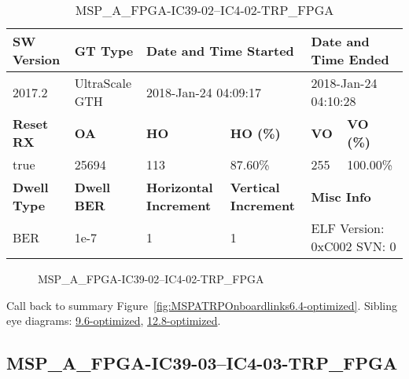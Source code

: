 \begin{table}[h]
\centering
\caption{MSP\_A\_FPGA-IC39-02--IC4-02-TRP\_FPGA}
\label{tab:MSPAFPGAIC3902IC402TRPFPGA6.4-optimized}
\begin{tabular}{@{}|l|l|l|l|l|l|@{}}
\toprule
\textbf{SW Version}                & \textbf{GT Type}   & \multicolumn{2}{l|}{\textbf{Date and Time Started}}            & \multicolumn{2}{l|}{\textbf{Date and Time Ended}}        \\ \midrule
2017.2                       & UltraScale GTH          & \multicolumn{2}{l|}{2018-Jan-24 04:09:17}                   & \multicolumn{2}{l|}{2018-Jan-24 04:10:28}               \\ \midrule
\textbf{Reset RX}                  & \textbf{OA} & \textbf{HO}   & \textbf{HO (\%)} & \textbf{VO} & \textbf{VO (\%)} \\ \midrule
true & 25694        & 113          & 87.60\%        & 255        & 100.00\%       \\ \midrule
\textbf{Dwell Type}                & \textbf{Dwell BER} & \textbf{Horizontal Increment} & \textbf{Vertical Increment}    & \multicolumn{2}{l|}{\textbf{Misc Info}}                  \\ \midrule
BER                            & 1e-7        & 1        & 1           & \multicolumn{2}{l|}{ELF Version: 0xC002 SVN: 0}                         \\ \bottomrule
\end{tabular}
\end{table}

\begin{figure}[h]
\caption{MSP\_A\_FPGA-IC39-02--IC4-02-TRP\_FPGA} \label{fig:MSPAFPGAIC3902IC402TRPFPGA6.4-optimized}
\end{figure}

Call back to summary Figure~\ref{fig:MSPATRPOnboardlinks6.4-optimized}.
Sibling eye diagrams: \hyperref[sec:MSPAFPGAIC3902IC402TRPFPGA9.6-optimized]{9.6-optimized}, \hyperref[sec:MSPAFPGAIC3902IC402TRPFPGA12.8-optimized]{12.8-optimized}.

\clearpage
\newpage


\subsection{MSP\_A\_FPGA-IC39-03--IC4-03-TRP\_FPGA}\label{sec:MSPAFPGAIC3903IC403TRPFPGA6.4-optimized}

